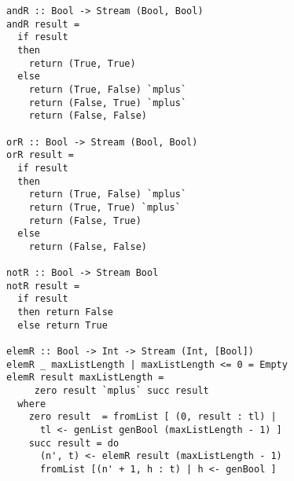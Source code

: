 \begin{figure}[!t]
  \centering
  \begin{minipage}{0.49\textwidth}
    \begin{lstlisting}[label={prop_helpers}, caption={Functions used in logic formulas generation}, captionpos=b, frame=tb]
andR :: Bool -> Stream (Bool, Bool)
andR result =
  if result
  then
    return (True, True)
  else
    return (True, False) `mplus`
    return (False, True) `mplus`
    return (False, False)

orR :: Bool -> Stream (Bool, Bool)
orR result =
  if result
  then
    return (True, False) `mplus`
    return (True, True) `mplus`
    return (False, True)
  else
    return (False, False)

notR :: Bool -> Stream Bool
notR result =
  if result
  then return False
  else return True

elemR :: Bool -> Int -> Stream (Int, [Bool])
elemR _ maxListLength | maxListLength <= 0 = Empty
elemR result maxListLength =
     zero result `mplus` succ result
  where
    zero result  = fromList [ (0, result : tl) |
      tl <- genList genBool (maxListLength - 1) ]
    succ result = do
      (n', t) <- elemR result (maxListLength - 1)
      fromList [(n' + 1, h : t) | h <- genBool ]
    \end{lstlisting}
  \end{minipage}
\end{figure}


